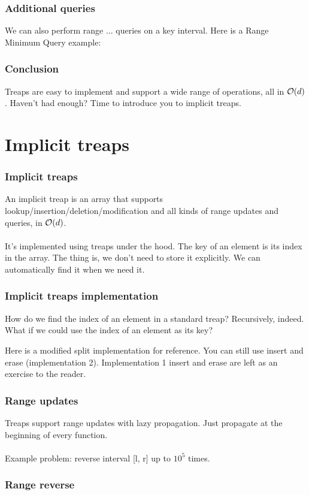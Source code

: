 \begin{frame}
	\frametitle{Additional queries}

	We can also perform range ... queries on a key interval. Here is a Range Minimum Query example:

	\begin{center}
		
	\end{center}
\end{frame}

\begin{frame}
	\frametitle{Conclusion}

	Treaps are easy to implement and support a wide range of operations, all in $\mathcal O(d)$. Haven't had enough? Time to introduce you to implicit treaps.
\end{frame}

\section{Implicit treaps}

\begin{frame}
	\frametitle{Implicit treaps}
	An implicit treap is an array that supports lookup/insertion/deletion/modification and all kinds of range updates and queries, in $\mathcal O(d)$. \\~\\
	It's implemented using treaps under the hood. The key of an element is its index in the array. The thing is, we don't need to store it explicitly. We can automatically find it when we need it.
\end{frame}

\begin{frame}
	\frametitle{Implicit treaps implementation}

	How do we find the index of an element in a standard treap? Recursively, indeed. What if we could use the index of an element as its key?

	\pause

	Here is a modified split implementation for reference. You can still use insert and erase (implementation 2). Implementation 1 insert and erase are left as an exercise to the reader.

	\begin{center}
		
	\end{center}
\end{frame}

\begin{frame}
	\frametitle{Range updates}

	Treaps support range updates with lazy propagation. Just propagate at the beginning of every function. \\~\\
	Example problem: reverse interval [l, r] up to $10^5$ times.
\end{frame}

\begin{frame}
	\frametitle{Range reverse}
	
	\begin{center}
		
	\end{center}
\end{frame}


